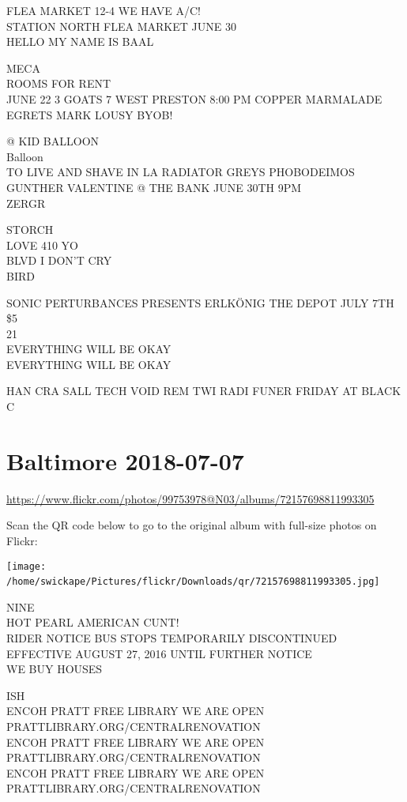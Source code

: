 \documentclass[10pt,letterpaper]{article}
\begin{document}
FLEA MARKET 12{-}4 WE HAVE A/C!\\
STATION NORTH FLEA MARKET JUNE 30\\
HELLO MY NAME IS BAAL

MECA\\
ROOMS FOR RENT\\
JUNE 22 3 GOATS 7 WEST PRESTON 8:00 PM COPPER MARMALADE EGRETS MARK LOUSY BYOB!

@ KID BALLOON\\
Balloon\\
TO LIVE AND SHAVE IN LA RADIATOR GREYS PHOBODEIMOS GUNTHER VALENTINE @ THE BANK JUNE 30TH 9PM\\
ZERGR

STORCH\\
LOVE 410 YO\\
BLVD I DON'T CRY\\
BIRD

SONIC PERTURBANCES PRESENTS ERLKÖNIG THE DEPOT JULY 7TH \$5\\
21\\
EVERYTHING WILL BE OKAY\\
EVERYTHING WILL BE OKAY

HAN CRA SALL TECH VOID REM TWI RADI FUNER FRIDAY AT BLACK C
\

\section*{Baltimore 2018-07-07}

\url{https://www.flickr.com/photos/99753978@N03/albums/72157698811993305}

Scan the QR code below to go to the original album with full-size photos on Flickr:

\texttt{[image: /home/swickape/Pictures/flickr/Downloads/qr/72157698811993305.jpg]}
\

NINE\\
HOT PEARL AMERICAN CUNT!\\
RIDER NOTICE BUS STOPS TEMPORARILY DISCONTINUED EFFECTIVE AUGUST 27, 2016 UNTIL FURTHER NOTICE\\
WE BUY HOUSES

ISH\\
ENCOH PRATT FREE LIBRARY WE ARE OPEN PRATTLIBRARY.ORG/CENTRALRENOVATION\\
ENCOH PRATT FREE LIBRARY WE ARE OPEN PRATTLIBRARY.ORG/CENTRALRENOVATION\\
ENCOH PRATT FREE LIBRARY WE ARE OPEN PRATTLIBRARY.ORG/CENTRALRENOVATION
\end{document}
